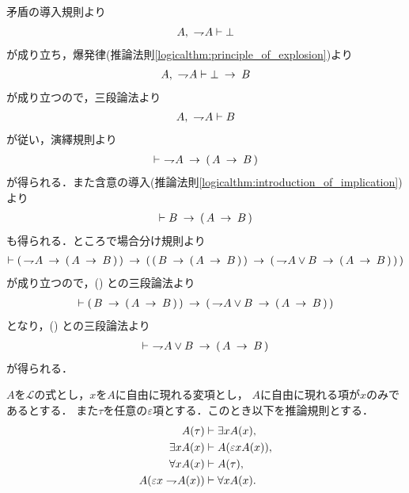 	\begin{prf}
		矛盾の導入規則より
		\begin{align}
			A,\ \rightharpoondown\hspace{-0.25em} A \vdash \bot
		\end{align}
		が成り立ち，爆発律(推論法則\ref{logicalthm:principle_of_explosion})より
		\begin{align}
			A,\ \rightharpoondown\hspace{-0.25em} A \vdash \bot \hspace{0.25em}\rightarrow\hspace{0.25em} B
		\end{align}
		が成り立つので，三段論法より
		\begin{align}
			A,\ \rightharpoondown\hspace{-0.25em} A \vdash B
		\end{align}
		が従い，演繹規則より
		\begin{align}
			\vdash\ \negation A \rarrow (\, A \rarrow B\, )
			\label{fom:disjunction_of_negation_rewritable_by_implication_1}
		\end{align}
		が得られる．また含意の導入(推論法則\ref{logicalthm:introduction_of_implication})より
		\begin{align}
			\vdash B \rarrow (\, A \rarrow B\, )
			\label{fom:disjunction_of_negation_rewritable_by_implication_2}
		\end{align}
		も得られる．ところで場合分け規則より
		\begin{align}
			\vdash (\, \rightharpoondown\hspace{-0.25em} A \hspace{0.25em}\rightarrow\hspace{0.25em} (\, A \hspace{0.25em}\rightarrow\hspace{0.25em} B\, )\, )
			\hspace{0.25em}\rightarrow\hspace{0.25em} (\, (\, B \hspace{0.25em}\rightarrow\hspace{0.25em} (\, A \hspace{0.25em}\rightarrow\hspace{0.25em} B\, )\, )
			\hspace{0.25em}\rightarrow\hspace{0.25em} (\, \rightharpoondown\hspace{-0.25em} A \vee B \hspace{0.25em}\rightarrow\hspace{0.25em} (\, A \hspace{0.25em}\rightarrow\hspace{0.25em} B\, )\, )\, )
		\end{align}
		が成り立つので，()
		との三段論法より
		\begin{align}
			\vdash (\, B \hspace{0.25em}\rightarrow\hspace{0.25em} (\, A \hspace{0.25em}\rightarrow\hspace{0.25em} B\, )\, )
			\hspace{0.25em}\rightarrow\hspace{0.25em} (\, \rightharpoondown\hspace{-0.25em} A \vee B \hspace{0.25em}\rightarrow\hspace{0.25em} (\, A \hspace{0.25em}\rightarrow\hspace{0.25em} B\, )\, )
		\end{align}
		となり，()
		との三段論法より
		\begin{align}
			\vdash\ \rightharpoondown\hspace{-0.25em} A \vee B \hspace{0.25em}\rightarrow\hspace{0.25em} (\, A \hspace{0.25em}\rightarrow\hspace{0.25em} B\, )
		\end{align}
		が得られる．
		\QED
	\end{prf}
	
	\begin{screen}
		\begin{logicalaxm}[量化記号に関する規則]\label{logicalaxm:rules_of_quantifiers}
			$A$を$\mathcal{L}$の式とし，$x$を$A$に自由に現れる変項とし，
			$A$に自由に現れる項が$x$のみであるとする．
			また$\tau$を任意の$\varepsilon$項とする．このとき以下を推論規則とする．
			\begin{align}
				A(\tau) &\vdash \exists x A(x), \\
				\exists x A(x) &\vdash A(\varepsilon x A(x)), \\
				\forall x A(x) &\vdash A(\tau), \\
				A(\varepsilon x \rightharpoondown\hspace{-0.25em} A(x)) &\vdash \forall x A(x).
			\end{align}
		\end{logicalaxm}
	\end{screen}
	
